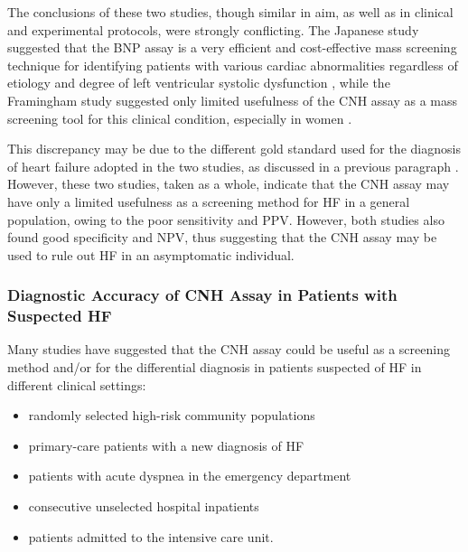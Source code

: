 \documentclass[14pt,a4paper,onecolumn]{extarticle}
\begin{document}
The conclusions of these two studies, though similar in aim, as well as in clinical and experimental protocols, were strongly conflicting. The Japanese study suggested that the BNP assay is a very efficient and cost-effective mass screening technique for identifying patients with various cardiac abnormalities regardless of etiology and degree of left ventricular systolic dysfunction \citep{bib366}, while the Framingham study suggested only limited usefulness of the CNH assay as a mass screening tool for this clinical condition, especially in women \citep{bib39}.

This discrepancy may be due to the different gold standard used for the diagnosis of heart failure adopted in the two studies, as discussed in a previous paragraph . However, these two studies, taken as a whole, indicate that the CNH assay may have only a limited usefulness as a screening method for HF in a general population, owing to the poor sensitivity and PPV. However, both studies also found good specificity and NPV, thus suggesting that the CNH assay may be used to rule out HF in an asymptomatic individual.

\subsubsection{ Diagnostic Accuracy of CNH Assay in Patients with Suspected HF}

Many studies \citep{bib392} \citep{bib3108} \citep{bib3109} \citep{bib3110} \citep{bib3111} \citep{bib3112} \citep{bib3113} \citep{bib3114} \citep{bib3115} \citep{bib3116} \citep{bib3117} \citep{bib3118} \citep{bib3119} \citep{bib3120} \citep{bib3121} \citep{bib3121} \citep{bib3123} \citep{bib3124} \citep{bib3125} \citep{bib3126} \citep{bib3152} \citep{bib3128} have suggested that the CNH assay could be useful as a screening method and/or for the differential diagnosis in patients suspected of HF in different clinical settings:
\begin{itemize}
  \item randomly selected high-risk community populations
  \item primary-care patients with a new diagnosis of HF
  \item patients with acute dyspnea in the emergency department
  \item consecutive unselected hospital inpatients
  \item patients admitted to the intensive care unit.
\end{itemize}
\end{document}
